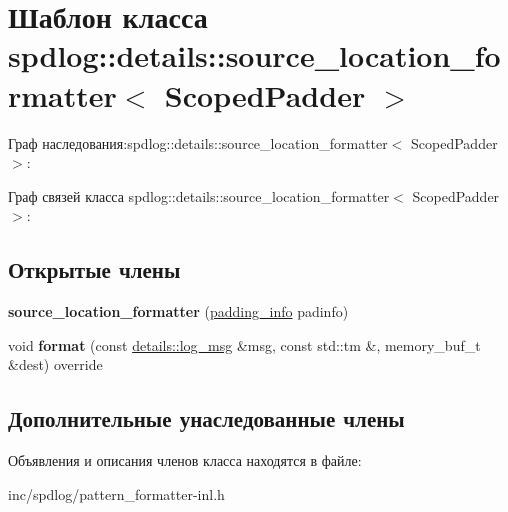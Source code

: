 \hypertarget{classspdlog_1_1details_1_1source__location__formatter}{}\section{Шаблон класса spdlog\+:\+:details\+:\+:source\+\_\+location\+\_\+formatter$<$ Scoped\+Padder $>$}
\label{classspdlog_1_1details_1_1source__location__formatter}


Граф наследования\+:spdlog\+:\+:details\+:\+:source\+\_\+location\+\_\+formatter$<$ Scoped\+Padder $>$\+:


Граф связей класса spdlog\+:\+:details\+:\+:source\+\_\+location\+\_\+formatter$<$ Scoped\+Padder $>$\+:
\subsection*{Открытые члены}
\begin{DoxyCompactItemize}
\item 
\mbox{\label{classspdlog_1_1details_1_1source__location__formatter_af8a36f302ad4fe4788abcd4a254eb27b}} 
{\bfseries source\+\_\+location\+\_\+formatter} (\hyperlink{structspdlog_1_1details_1_1padding__info}{padding\+\_\+info} padinfo)
\item 
\mbox{\label{classspdlog_1_1details_1_1source__location__formatter_a3446aeec393fddbde9fa3a6808109a87}} 
void {\bfseries format} (const \hyperlink{structspdlog_1_1details_1_1log__msg}{details\+::log\+\_\+msg} \&msg, const std\+::tm \&, memory\+\_\+buf\+\_\+t \&dest) override
\end{DoxyCompactItemize}
\subsection*{Дополнительные унаследованные члены}


Объявления и описания членов класса находятся в файле\+:\begin{DoxyCompactItemize}
\item 
inc/spdlog/pattern\+\_\+formatter-\/inl.\+h\end{DoxyCompactItemize}

